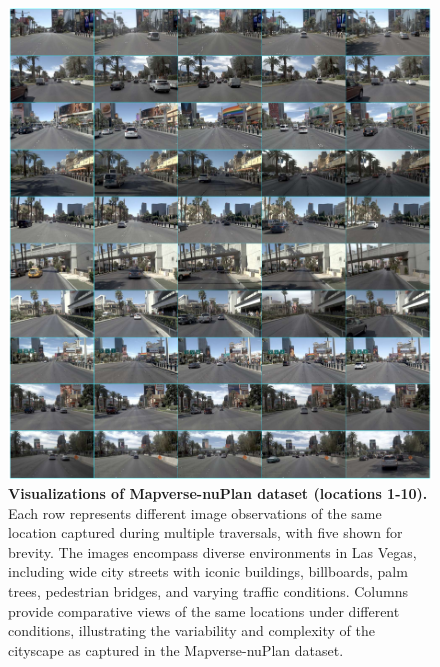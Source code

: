 \begin{figure}
    \centering
    \includegraphics[width=1\linewidth]{figs_compressed/vegas-1_compressed.pdf}
    \caption{\textbf{Visualizations of Mapverse-nuPlan dataset (locations 1-10).} Each row represents different image observations of the same location captured during multiple traversals, with five shown for brevity. The images encompass diverse environments in Las Vegas, including wide city streets with iconic buildings, billboards, palm trees, pedestrian bridges, and varying traffic conditions.  Columns provide comparative views of the same locations under different conditions, illustrating the variability and complexity of the cityscape as captured in the Mapverse-nuPlan dataset.
}
    \label{fig:nuplan-1}
\end{figure}

